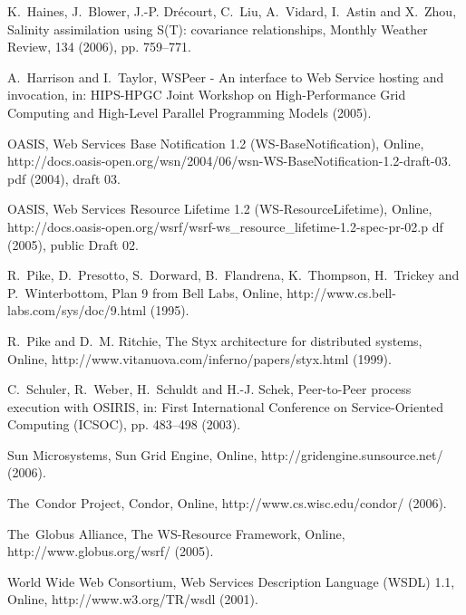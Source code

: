 \documentclass[a4paper]{article}
\begin{document}
\begin{thebibliography}{10}
K.~Haines, J.~Blower, J.-P. Dr\'{e}court, C.~Liu, A.~Vidard, I.~Astin and
  X.~Zhou, Salinity assimilation using {S}({T}): covariance relationships,
  Monthly Weather Review, 134 (2006), pp. 759--771.

A.~Harrison and I.~Taylor, {WSP}eer - {A}n interface to {W}eb {S}ervice hosting
  and invocation, in: {HIPS}-{HPGC} {J}oint {W}orkshop on {H}igh-{P}erformance
  {G}rid {C}omputing and {H}igh-{L}evel {P}arallel {P}rogramming {M}odels (2005).

{OASIS}, {W}eb {S}ervices {B}ase {N}otification 1.2
  ({WS}-{B}ase{N}otification), Online,
  http://docs.oasis-open.org/wsn/2004/06/wsn-WS-BaseNotification-1.2-draft-03.%
pdf (2004), draft 03.

{OASIS}, {W}eb {S}ervices {R}esource {L}ifetime 1.2
  ({WS}-{R}esource{L}ifetime), Online,
  http://docs.oasis-open.org/wsrf/wsrf-ws\_resource\_lifetime-1.2-spec-pr-02.p%
df (2005), public Draft 02.

R.~Pike, D.~Presotto, S.~Dorward, B.~Flandrena, K.~Thompson, H.~Trickey and
  P.~Winterbottom, Plan 9 from {B}ell {L}abs, Online,
  http://www.cs.bell-labs.com/sys/doc/9.html (1995).

R.~Pike and D.~M. Ritchie, The {S}tyx architecture for distributed systems,
  Online, http://www.vitanuova.com/inferno/papers/styx.html (1999).

C.~Schuler, R.~Weber, H.~Schuldt and H.-J. Schek, Peer-to-{P}eer process
  execution with {OSIRIS}, in: First International Conference on
  Service-Oriented Computing (ICSOC), pp. 483--498 (2003).

{S}un {M}icrosystems, {S}un {G}rid {E}ngine, Online,
  http://gridengine.sunsource.net/ (2006).

{T}he~{C}ondor {P}roject, Condor, Online, http://www.cs.wisc.edu/condor/
  (2006).

{T}he~{G}lobus {A}lliance, {T}he {WS}-{R}esource {F}ramework, Online,
  http://www.globus.org/wsrf/ (2005).

{World Wide Web Consortium}, {W}eb {S}ervices {D}escription {L}anguage ({WSDL})
  1.1, Online, http://www.w3.org/TR/wsdl (2001).

\end{thebibliography}

\newpage
\singlespace
\end{document}
